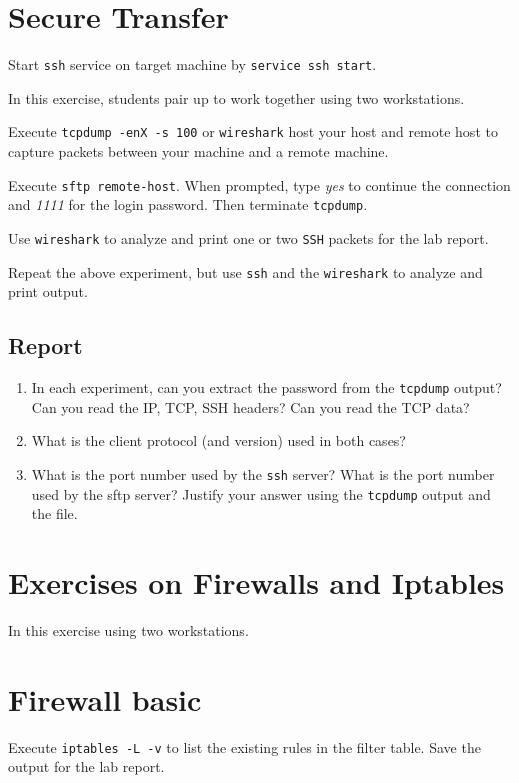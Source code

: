 \documentclass{../UTNetLab}
\begin{document}
\section{Secure Transfer}
    Start \lstinline{ssh} service on target machine by \lstinline{service ssh start}.

        In this exercise, students pair up to work together using two workstations.
    
    Execute \lstinline{tcpdump -enX -s 100} or \lstinline{wireshark} host your host and remote host to capture packets between your machine and a remote machine.

    Execute \lstinline[emph={your-host, remote-host}]{sftp remote-host}. When prompted, type \textit{yes} to continue the connection and \textit{1111} for the login password. Then terminate \lstinline{tcpdump}.

    Use \lstinline{wireshark} to analyze and print one or two \lstinline{SSH} packets for the lab report.

    Repeat the above experiment, but use \lstinline{ssh} and the \lstinline{wireshark} to analyze and print output.


    \subsection*{Report}
    \begin{enumerate}
        \item In each experiment, can you extract the password from the \lstinline{tcpdump} output? Can you read the IP, TCP, SSH headers? Can you read the TCP data?
        \item What is the client protocol (and version) used in both cases?
        \item What is the port number used by the \lstinline{ssh} server? What is the port number used by the sftp server? Justify your answer using the \lstinline{tcpdump} output and the  file.
    \end{enumerate}

\section*{Exercises on Firewalls and Iptables}
    In this exercise using two workstations.

\section{Firewall basic}
    Execute \lstinline{iptables -L -v} to list the existing rules in the filter table. Save the output for the lab report.
\end{document}
